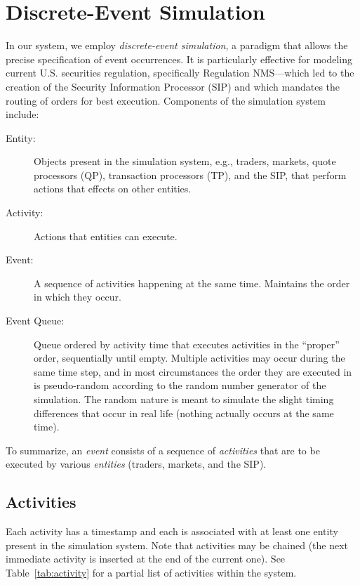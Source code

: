 \documentclass[11pt]{article}
\begin{document}
\section{Discrete-Event Simulation}

In our system, we employ \emph{discrete-event simulation}, a paradigm that
allows the precise specification of event occurrences. It is particularly
effective for modeling current U.S. securities regulation, specifically
Regulation NMS---which led to the creation of the Security Information Processor
(SIP) and which mandates the routing of orders for best execution.  Components
of the simulation system include:

\begin{description}
\item[Entity:] Objects present in the simulation system, e.g., traders, markets, quote processors (QP), transaction processors (TP), and the SIP, that perform actions that effects on other entities.

\item[Activity:] Actions that entities can execute.

\item[Event:] A sequence of activities happening at the same time. Maintains the
  order in which they occur.

\item[Event Queue:] Queue ordered by activity time that executes activities in
  the ``proper'' order, sequentially until empty. Multiple activities may occur
  during the same time step, and in most circumstances the order they are
  executed in is pseudo-random according to the random number generator of the
  simulation. The random nature is meant to simulate the slight timing
  differences that occur in real life (nothing actually occurs at the same
  time).
\end{description}

To summarize, an \emph{event} consists of a sequence of \emph{activities} that
are to be executed by various \emph{entities} (traders, markets, and the SIP).


\subsection{Activities}

Each activity has a timestamp and each is associated with at least one entity
present in the simulation system. Note that activities may be chained (the next
immediate activity is inserted at the end of the current one). See
Table~\ref{tab:activity} for a partial list of activities within the system.
\end{document}
